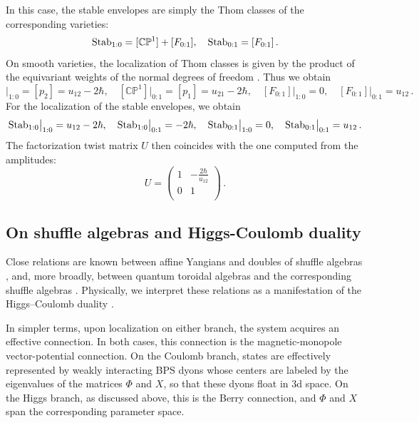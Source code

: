 \documentclass[10pt]{article}
\theoremstyle{definition}
\def\IC{\mathbb{C}}
\def\IP{\mathbb{P}}
\numberwithin{equation}{section}
\begin{document}
In this case, the stable envelopes are simply the Thom classes of the corresponding varieties:
\begin{equation}
	{\rm Stab}_{1:0}=[\IC\IP^1]+[F_{0:1}], \quad {\rm Stab}_{0:1}=[F_{0:1}]\,.
\end{equation}
On smooth varieties, the localization of Thom classes is given by the product of the equivariant weights of the normal degrees of freedom \cite{guillemin1999supersymmetry}.
Thus we obtain
\begin{equation}
	[\IC\IP^1]\big|_{1:0}=[p_2]=u_{12}-2\hbar,\quad [\IC\IP^1]\big|_{0:1}=[p_1]=u_{21}-2\hbar, \quad [F_{0:1}]\big|_{1:0}=0,\quad [F_{0:1}]\big|_{0:1}=u_{12}\,.
\end{equation}
For the localization of the stable envelopes, we obtain
\begin{equation}
	{\rm Stab}_{1:0}\big|_{1:0}=u_{12}-2\hbar,\quad {\rm Stab}_{1:0}\big|_{0:1}=-2\hbar,\quad {\rm Stab}_{0:1}\big|_{1:0}=0,\quad {\rm Stab}_{0:1}\big|_{0:1}=u_{12}\,. 
\end{equation}
The factorization twist matrix $U$ then coincides with the one computed from the amplitudes:
\begin{equation}
	U=\begin{pmatrix}
		1 & -\frac{2\hbar}{u_{12}}\\
		0 & 1\\
	\end{pmatrix}\,.
\end{equation}

\subsection{On shuffle algebras and Higgs-Coulomb duality}\label{sec:HCdu}

Close relations are known between affine Yangians and doubles of shuffle algebras \cite{Yang:2018pbw,Tsymbaliuk:2022bqx}, and, more broadly, between quantum toroidal algebras and the corresponding shuffle algebras \cite{Negut:2013cz,Negut:2019tto}.
Physically, we interpret these relations as a manifestation of the Higgs--Coulomb duality \cite{Denef:2002ru}.

In simpler terms, upon localization on either branch, the system acquires an effective connection.
In both cases, this connection is the magnetic-monopole vector-potential connection.
On the Coulomb branch, states are effectively represented by weakly interacting BPS dyons whose centers are labeled by the eigenvalues of the matrices $\Phi$ and $X$, so that these dyons float in 3d space.
On the Higgs branch, as discussed above, this is the Berry connection, and $\Phi$ and $X$ span the corresponding parameter space.
\end{document}
